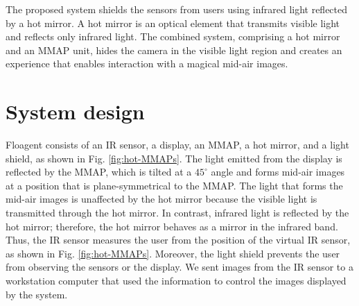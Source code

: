 \documentclass[sigconf]{acmart}
\begin{document}
The proposed system shields the sensors from users using infrared light reflected by a hot mirror.
A hot mirror is an optical element that transmits visible light and reflects only infrared light.
The combined system, comprising a hot mirror and an MMAP unit, hides the camera in the visible light region and creates an experience that enables interaction with a magical mid-air images.

\section{System design \label{proposed}}

Floagent consists of an IR sensor, a display, an MMAP, a hot mirror, and a light shield, as shown in Fig. \ref{fig:hot-MMAPs}.
The light emitted from the display is reflected by the MMAP, which is tilted at a $45^\circ$ angle and forms mid-air images at a position that is plane-symmetrical to the MMAP.
The light that forms the mid-air images is unaffected by the hot mirror because the visible light is transmitted through the hot mirror.
In contrast, infrared light is reflected by the hot mirror; therefore, the hot mirror behaves as a mirror in the infrared band.
Thus, the IR sensor measures the user from the position of the virtual IR sensor, as shown in Fig. \ref{fig:hot-MMAPs}.
Moreover, the light shield prevents the user from observing the sensors or the display.
We sent images from the IR sensor to a workstation computer that used the information to control the images displayed by the system.
\end{document}
